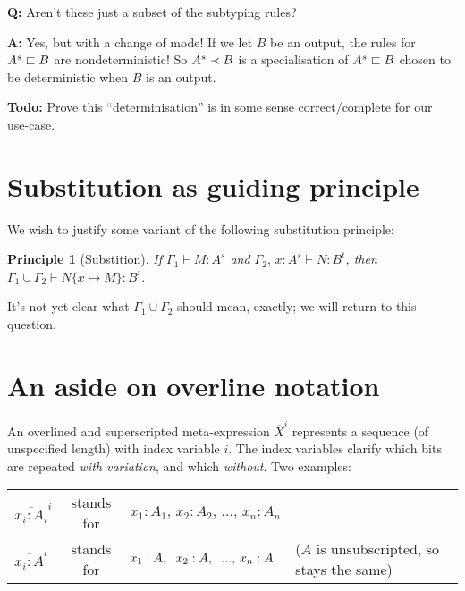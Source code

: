 \documentclass{article}
\newtheorem{principle}{Principle}
\newcommand{\todo}[1]{{\color{red}#1}}
\newcommand{\GG}{\Gamma}
\newcommand{\sub}[1]{\{{#1}\}}
\newcommand{\h}[3]{#1 : {#2}^{#3}}
\begin{document}
\textbf{Q:} Aren't these just a subset of the subtyping rules?

\textbf{A:} Yes, but with a change of mode! If we let $B$ be an output, the
rules for $\subtype{s}{A}{B}$ are nondeterministic! So $\converts{s}{A}{B}$ is a
specialisation of $\subtype{s}{A}{B}$ chosen to be deterministic when $B$ is an
output.

\textbf{Todo:} Prove this ``determinisation'' is in some sense
correct/complete for our use-case.


\section{Substitution as guiding principle}

We wish to justify some variant of the following substitution principle:

\begin{principle}[Substition]
  If $\GG_1 \vdash \h{M}{A}{s}$ and $\GG_2,\, \h{x}{A}{s} \vdash \h{N}{B}{t}$,
  then \(\GG_1 \cup \GG_2 \vdash \h{N\sub{x \mapsto M}}{B}{t}\).
\end{principle}

It's not yet clear what $\GG_1 \cup \GG_2$ should mean, exactly; \todo{we will
  return to this question.}


\section{An aside on overline notation}

\newcommand{\xbar}[2]{\overline{#2}^{#1}}

An overlined and superscripted meta-expression $\xbar{i}{X}$ represents a
sequence (of unspecified length) with index variable $i$. The index variables
clarify which bits are repeated \emph{with variation}, and which \emph{without}.
Two examples:

\begin{center}
  \begin{tabular}{lcll}
    $\xbar{i}{x_i : A_i}$ & stands for
    & $x_1 : A_1,\, x_2 : A_2,\, ...,\, x_n : A_n$
    \\
    $\xbar{i}{x_i : A}$ & stands for
    & $x_1 : A,\hspace{0.6em} x_2 : A,\hspace{0.6em} ...,\, x_n : A$
    & ($A$ is unsubscripted, so stays the same)
  \end{tabular}
\end{center}
\end{document}
